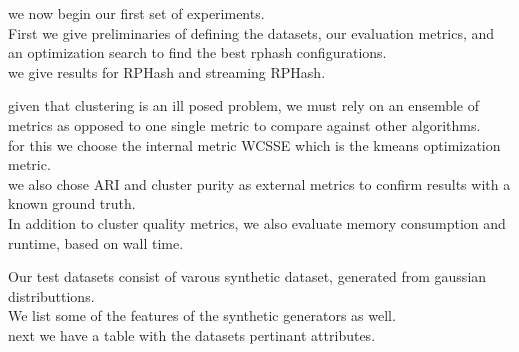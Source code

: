 \documentclass{beamer}
\begin{document}
\begin{frame}[plain]
we now begin our first set of experiments. \\

First we give preliminaries of defining
the datasets, our evaluation metrics, and an optimization search to find the best
rphash configurations. \\

we give results for RPHash and streaming RPHash.
\end{frame}

\begin{frame}[plain]
given that clustering is an ill posed problem, we must rely on an ensemble of
metrics as opposed to one single metric to compare against other algorithms.\\

for this we choose the internal metric WCSSE which is the kmeans optimization
metric. \\

we also chose ARI and cluster purity as external metrics to confirm
results with a known ground truth. \\

In addition to cluster quality metrics, we
also evaluate memory consumption and runtime, based on wall time.
\end{frame}

\begin{frame}[plain]
Our test datasets consist of varous synthetic dataset, generated from gaussian
distributtions. \\

We list some of the features of the synthetic generators as well.\\

next we have a table with the datasets pertinant attributes.
\end{frame}
\end{document}
